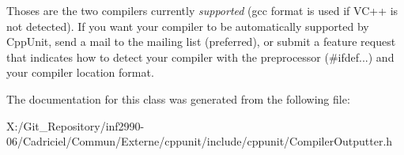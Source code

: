 Thoses are the two compilers currently {\itshape supported} (gcc format is used if V\-C++ is not detected). If you want your compiler to be automatically supported by Cpp\-Unit, send a mail to the mailing list (preferred), or submit a feature request that indicates how to detect your compiler with the preprocessor (\#ifdef...) and your compiler location format. 

The documentation for this class was generated from the following file\-:\begin{DoxyCompactItemize}
\item 
X\-:/\-Git\-\_\-\-Repository/inf2990-\/06/\-Cadriciel/\-Commun/\-Externe/cppunit/include/cppunit/Compiler\-Outputter.\-h\end{DoxyCompactItemize}
